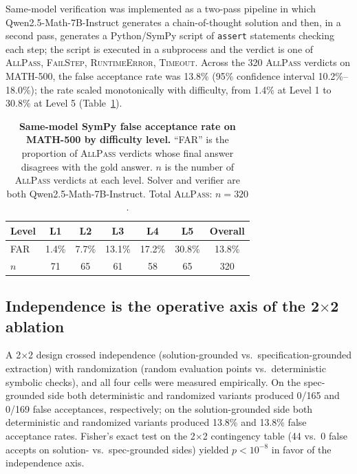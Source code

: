 \documentclass{article}
\begin{document}
Same-model verification was implemented as a two-pass pipeline in which Qwen2.5-Math-7B-Instruct generates a chain-of-thought solution and then, in a second pass, generates a Python/SymPy script of \texttt{assert} statements checking each step; the script is executed in a subprocess and the verdict is one of \textsc{AllPass}, \textsc{FailStep}, \textsc{RuntimeError}, \textsc{Timeout}. Across the 320 \textsc{AllPass} verdicts on MATH-500, the false acceptance rate was 13.8\% (95\% confidence interval 10.2\%--18.0\%); the rate scaled monotonically with difficulty, from 1.4\% at Level 1 to 30.8\% at Level 5 (Table~\ref{tab:collapse}).

\begin{table}[t]
\centering
\caption{\textbf{Same-model SymPy false acceptance rate on MATH-500 by difficulty level.} ``FAR'' is the proportion of \textsc{AllPass} verdicts whose final answer disagrees with the gold answer. $n$ is the number of \textsc{AllPass} verdicts at each level. Solver and verifier are both Qwen2.5-Math-7B-Instruct. Total \textsc{AllPass}: $n{=}320$.}
\label{tab:collapse}
\small
\setlength{\tabcolsep}{4pt}
\begin{tabular}{lcccccc}
\toprule
Level & L1 & L2 & L3 & L4 & L5 & Overall \\
\midrule
FAR   & 1.4\% & 7.7\% & 13.1\% & 17.2\% & 30.8\% & 13.8\% \\
$n$   & 71    & 65    & 61     & 58     & 65     & 320 \\
\bottomrule
\end{tabular}
\end{table}

\subsection{Independence is the operative axis of the 2$\times$2 ablation}

A 2$\times$2 design crossed independence (solution-grounded vs.\ specification-grounded extraction) with randomization (random evaluation points vs.\ deterministic symbolic checks), and all four cells were measured empirically. On the spec-grounded side both deterministic and randomized variants produced 0/165 and 0/169 false acceptances, respectively; on the solution-grounded side both deterministic and randomized variants produced 13.8\% and 13.8\% false acceptance rates. Fisher's exact test on the 2$\times$2 contingency table (44 vs.\ 0 false accepts on solution- vs.\ spec-grounded sides) yielded $p<10^{-8}$ in favor of the independence axis.
\end{document}
